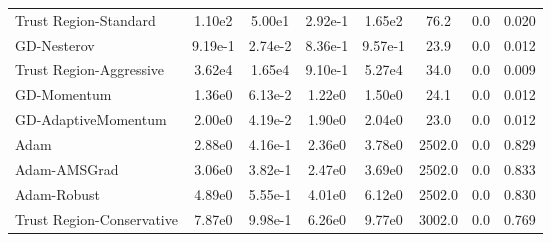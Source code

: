 \documentclass{article}
\begin{document}
\begin{table}[htbp]
{\begin{tabular}{p{2.5cm}*{7}{c}}
Trust Region-Standard & 1.10e2 & 5.00e1 & 2.92e-1 & 1.65e2 & 76.2 & 0.0 & 0.020 \\
GD-Nesterov & 9.19e-1 & 2.74e-2 & 8.36e-1 & 9.57e-1 & 23.9 & 0.0 & 0.012 \\
Trust Region-Aggressive & 3.62e4 & 1.65e4 & 9.10e-1 & 5.27e4 & 34.0 & 0.0 & 0.009 \\
GD-Momentum & 1.36e0 & 6.13e-2 & 1.22e0 & 1.50e0 & 24.1 & 0.0 & 0.012 \\
GD-AdaptiveMomentum & 2.00e0 & 4.19e-2 & 1.90e0 & 2.04e0 & 23.0 & 0.0 & 0.012 \\
Adam & 2.88e0 & 4.16e-1 & 2.36e0 & 3.78e0 & 2502.0 & 0.0 & 0.829 \\
Adam-AMSGrad & 3.06e0 & 3.82e-1 & 2.47e0 & 3.69e0 & 2502.0 & 0.0 & 0.833 \\
Adam-Robust & 4.89e0 & 5.55e-1 & 4.01e0 & 6.12e0 & 2502.0 & 0.0 & 0.830 \\
Trust Region-Conservative & 7.87e0 & 9.98e-1 & 6.26e0 & 9.77e0 & 3002.0 & 0.0 & 0.769 \\
\bottomrule
\end{tabular}
}
\end{table}
\end{document}

